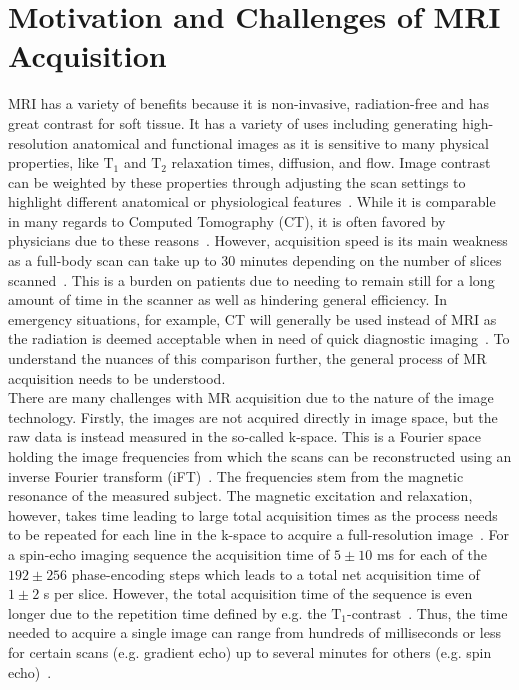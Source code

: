 \section{Motivation and Challenges of MRI Acquisition} \label{Sec:MotivationChallengesMRIAcquisition}
MRI has a variety of benefits because it is non-invasive, radiation-free and has great contrast for soft tissue. It has a variety of uses including generating high-resolution anatomical and functional images as it is sensitive to many physical properties, like $\text{T}_1$ and $\text{T}_2$ relaxation times, diffusion, and flow. Image contrast can be weighted by these properties through adjusting the scan settings to highlight different anatomical or physiological features~\cite{AdvancesPI}. While it is comparable in many regards to Computed Tomography (CT), it is often favored by physicians due to these reasons~\cite{Liu2013}. However, acquisition speed is its main weakness as a full-body scan can take up to 30 minutes depending on the number of slices scanned~\cite{Brown2014,PulseSequences}. This is a burden on patients due to needing to remain still for a long amount of time in the scanner as well as hindering general efficiency. In emergency situations, for example, CT will generally be used instead of MRI as the radiation is deemed acceptable when in need of quick diagnostic imaging~\cite{Liu2013}. To understand the nuances of this comparison further, the general process of MR acquisition needs to be understood.\\
There are many challenges with MR acquisition due to the nature of the image technology. Firstly, the images are not acquired directly in image space, but the raw data is instead measured in the so-called k-space. This is a Fourier space holding the image frequencies from which the scans can be reconstructed using an inverse Fourier transform (iFT)~\cite{Brown2014}. The frequencies stem from the magnetic resonance of the measured subject. The magnetic excitation and relaxation, however, takes time leading to large total acquisition times as the process needs to be repeated for each line in the k-space to acquire a full-resolution image~\cite{AdvancesPI}. For a spin-echo imaging sequence the acquisition time of $5 \pm 10$ ms for each of the $192 \pm 256$ phase-encoding steps which leads to a total net acquisition time of $1 \pm 2$ s per slice. However, the total acquisition time of the sequence is even longer due to the repetition time defined by e.g. the $\text{T}_1$-contrast~\cite{SamplingStrategies}. Thus, the time needed to
acquire a single image can range from hundreds of milliseconds or less for certain scans (e.g. gradient echo) up to several minutes for others (e.g. spin echo)~\cite{AdvancesPI}.\\
